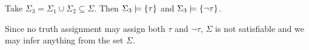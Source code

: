 \begin{problem}
\begin{enumalph}
\begin{Answer}
        \noindent
        Take $\Sigma_3 = \Sigma_1 \cup \Sigma_2 \subseteq \Sigma$.
        Then $\Sigma_3 \models \left\{\tau\right\}$ and $\Sigma_3 \models \left\{\lnot \tau\right\}$.

        \noindent
        Since no truth assignment may assign both $\tau$ and $\lnot \tau$,
        $\Sigma$ is not satisfiable and we may infer anything from the set $\Sigma$.
      \end{Answer}
  \end{enumalph}
\end{problem}
